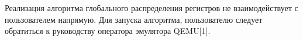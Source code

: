 Реализация алгоритма глобального распределения регистров не взаимодействует с пользователем напрямую.
Для запуска алгоритма, пользователю следует обратиться к руководству оператора эмулятора QEMU[1].